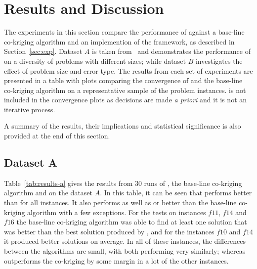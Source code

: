 \section{Results and Discussion}\label{sec:results}
The experiments in this section compare the performance of \AlgName{} against a base-line co-kriging algorithm and an implemention of the \motos{} framework, as described in Section~\ref{sec:exp}. Dataset $A$ is taken from~\cite{lv2021multi} and demonstrates the performance of \AlgName{} on a diversity of problems with different sizes; while dataset $B$ investigates the effect of problem size and error type. The results from each set of experiments are presented in a table with plots comparing the convergence of \AlgName{} and the base-line co-kriging algorithm on a representative sample of the problem instances. \motos{} is not included in the convergence plots as decisions are made \emph{a priori} and it is not an iterative process.

A summary of the results, their implications and statistical significance is also provided at the end of this section.

\subsection*{Dataset A}

Table~\ref{tab:results-a} gives the results from 30 runs of \AlgName{}, the base-line co-kriging algorithm and \motos{} on the dataset $A$. In this table, it can be seen that \AlgName{} performs better than \motos{} for all instances. It also performs as well as or better than the base-line co-kriging algorithm with a few exceptions. For the tests on instances $f11$, $f14$ and $f16$ the base-line co-kriging algorithm was able to find at least one solution that was better than the best solution produced by \AlgName{}, and for the instances $f10$ and $f14$ it produced better solutions on average. In all of these instances, the differences between the algorithms are small, with both performing very similarly; whereas \AlgName{} outperforms the co-kriging by some margin in a lot of the other instances.

